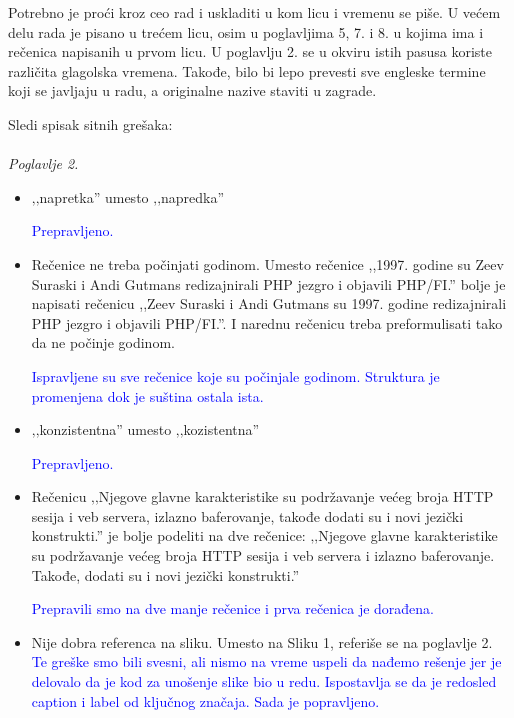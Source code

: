 \documentclass[a4paper]{report}
\newcommand{\odgovor}[1]{\textcolor{blue}{#1}}
\begin{document}
Potrebno je proći kroz ceo rad i uskladiti u kom licu i vremenu se piše. U većem delu rada je pisano u trećem licu, osim u poglavljima 5, 7. i 8. u kojima ima i rečenica napisanih u prvom licu. U poglavlju 2. se u okviru istih pasusa koriste različita glagolska vremena. Takođe, bilo bi lepo prevesti sve engleske termine koji se javljaju u radu, a originalne nazive staviti u zagrade.

Sledi spisak sitnih grešaka:\\\\

\textit{Poglavlje 2.}
\begin{itemize}
\item ‚‚napretka'' umesto ‚‚napredka''

\odgovor{Prepravljeno.}

\item Rečenice ne treba počinjati godinom. Umesto rečenice ,,1997. godine su Zeev Suraski i Andi Gutmans redizajnirali PHP jezgro i objavili PHP/FI.'' bolje je napisati rečenicu ,,Zeev Suraski i Andi Gutmans su 1997. godine redizajnirali PHP jezgro i objavili PHP/FI.''. I narednu rečenicu treba preformulisati tako da ne počinje godinom.

\odgovor{Ispravljene su sve rečenice koje su počinjale godinom. Struktura je promenjena dok je suština ostala ista.}

\item ‚‚konzistentna'' umesto ‚‚kozistentna''

\odgovor{Prepravljeno.}

\item Rečenicu ‚‚Njegove glavne karakteristike su podržavanje većeg broja HTTP sesija i veb servera, izlazno baferovanje, takođe dodati su i novi jezički konstrukti.'' je bolje podeliti na dve rečenice: ‚‚Njegove glavne karakteristike su podržavanje većeg broja HTTP sesija i veb servera i izlazno baferovanje. Takođe, dodati su i novi jezički konstrukti.''

\odgovor{Prepravili smo na dve manje rečenice i prva rečenica je dorađena.}

\item Nije dobra referenca na sliku. Umesto na Sliku 1, referiše se na poglavlje 2.\\
\odgovor{Te greške smo bili svesni, ali nismo na vreme uspeli da nađemo rešenje jer je delovalo da je kod za unošenje slike bio u redu. Ispostavlja se da je redosled caption i label od ključnog značaja. Sada je popravljeno.}
\end{itemize}
\end{document}
